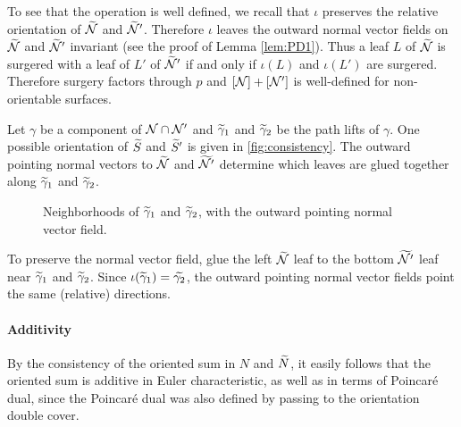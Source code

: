 To see that the operation is well defined, we recall that $\iota$ preserves the relative orientation of $\widetilde{\mathcal{N}}$ and $\widetilde{\mathcal{N}}'$.  Therefore $\iota$ leaves the outward normal vector fields on $\widetilde{\mathcal{N}}$ and $\widetilde{\mathcal{N}}'$ invariant (see the proof of Lemma \ref{lem:PD1}).
Thus a leaf $L$ of $\widetilde{\mathcal{N}}$ is surgered with a leaf of $L'$ of $\widetilde{\mathcal{N}}'$ if and only if $\iota(L)$ and $\iota(L')$ are surgered.
Therefore surgery factors through $p$ and $[\mathcal{N}]+[\mathcal{N}']$ is well-defined for non-orientable surfaces.

  Let $\gamma$ be a component of $\mathcal{N}\cap \mathcal{N}'$ and $\widetilde{\gamma}_1$ and $\widetilde{\gamma}_2$ be the path lifts of $\gamma$.
  One possible orientation of $\widetilde{S}$ and $\widetilde{S}'$ is given in  \autoref{fig:consistency}.  The outward pointing normal vectors to $\widetilde{\mathcal{N}}$ and $\widetilde{\mathcal{N}'}$ determine which leaves are glued together along $\widetilde{\gamma}_1$ and $\widetilde{\gamma}_2$.

\begin{figure}
  \centering
  \caption{Neighborhoods of $\widetilde{\gamma}_1$ and $\widetilde{\gamma}_2$, with the outward pointing normal vector field.}
  \label{fig:consistency}
\end{figure}

To preserve the normal vector field, glue the left $\widetilde{\mathcal{N}}$ leaf to the bottom $\widetilde{\mathcal{N}'}$ leaf near $\widetilde{\gamma}_1$ and $\widetilde{\gamma}_2$.
Since $\iota(\widetilde{\gamma}_1)=\widetilde{\gamma_2}$, the outward pointing normal vector fields point the same (relative) directions.


\paragraph{Additivity}

By the consistency of the oriented sum in $N$ and $\widetilde{N}$, it easily follows that the oriented sum is additive in Euler characteristic, as well as in terms of Poincar\'e dual, since the Poincar\'e dual was also defined by passing to the orientation double cover.
